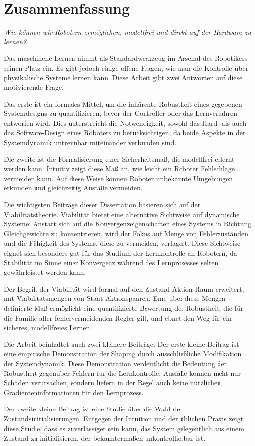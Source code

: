 
\chapter*{Zusammenfassung}
\emph{Wie k\"{o}nnen wir Robotern erm\"{o}glichen, modellfrei und direkt auf der Hardware zu lernen?} \par

Das maschinelle Lernen nimmt als Standardwerkzeug im Arsenal des Robotikers seinen Platz ein. Es gibt jedoch einige offene Fragen, wie man die Kontrolle über physikalische Systeme lernen kann. Diese Arbeit gibt zwei Antworten auf diese motivierende Frage. \par
Das erste ist ein formales Mittel, um die inh\"{a}rente Robustheit eines gegebenen Systemdesigns zu quantifizieren, bevor der Controller oder das Lernverfahren entworfen wird. Dies unterstreicht die Notwendigkeit, sowohl das Hard- als auch das Software-Design eines Roboters zu berücksichtigen, da beide Aspekte in der Systemdynamik untrennbar miteinander verbunden sind. \par
Die zweite ist die Formalisierung einer Sicherheitsma{\ss}, die modellfrei erlernt werden kann. Intuitiv zeigt diese Ma{\ss} an, wie leicht ein Roboter Fehlschl\"{a}ge vermeiden kann. Auf diese Weise k\"{o}nnen Roboter unbekannte Umgebungen erkunden und gleichzeitig Ausf\"{a}lle vermeiden. \par
Die wichtigsten Beitr\"{a}ge dieser Dissertation basieren sich auf der Viabilit\"{a}tstheorie. Viabilit\"{a}t bietet eine alternative Sichtweise auf dynamische Systeme: Anstatt sich auf die Konvergenzeigenschaften eines Systems in Richtung Gleichgewichte zu konzentrieren, wird der Fokus auf Menge von Fehlerzust\"{a}nden und die F\"{a}higkeit des Systems, diese zu vermeiden, verlagert. Diese Sichtweise eignet sich besonders gut für das Studium der Lernkontrolle an Robotern, da Stabilit\"{a}t im Sinne einer Konvergenz w\"{a}hrend des Lernprozesses selten gew\"{a}hrleistet werden kann. \par
Der Begriff der Viabilit\"{a}t wird formal auf den Zustand-Aktion-Raum erweitert, mit Viabilit\"{a}tsmengen von Staat-Aktionspaaren. Eine über diese Mengen definierte Ma{\ss} erm\"{o}glicht eine quantifizierte Bewertung der Robustheit, die für die Familie aller fehlervermeidenden Regler gilt, und ebnet den Weg für ein sicheres, modellfreies Lernen. \par
Die Arbeit beinhaltet auch zwei kleinere Beitr\"{a}ge. Der erste kleine Beitrag ist eine empirische Demonstration der Shaping durch ausschlie{\ss}liche Modifikation der Systemdynamik. Diese Demonstration verdeutlicht die Bedeutung der Robustheit gegenüber Fehlern für die Lernkontrolle: Ausf\"{a}lle k\"{o}nnen nicht nur Sch\"{a}den verursachen, sondern liefern in der Regel auch keine nützlichen Gradienteninformationen für den Lernprozess. \par
Der zweite kleine Beitrag ist eine Studie über die Wahl der Zustandsinitialisierungen. Entgegen der Intuition und der üblichen Praxis zeigt diese Studie, dass es zuverl\"{a}ssiger sein kann, das System gelegentlich aus einem Zustand zu initialisieren, der bekannterma{\ss}en unkontrollierbar ist. 